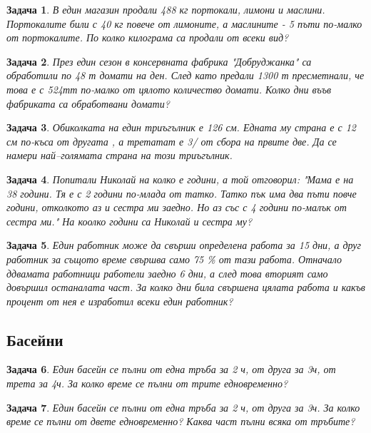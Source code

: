 \documentclass{article}
\newtheorem{problem}{Задача}
\begin{document}
\begin{problem}
	В един магазин продали 488 кг портокали, лимони и маслини. Портокалите били с 40 кг повече от лимоните, а маслините - 5 пъти по-малко от портокалите. По колко килограма са продали от всеки вид?
\end{problem}

\begin{problem}
	През един сезон в консервната фабрика "Добруджанка" са обработили по 48 т домати на ден. След като предали 1300 т пресметнали, че това е с 524тт по-малко от цялото количество домати. Колко дни въъв фабриката са обработвани домати?
\end{problem}


\begin{problem}
	Обиколката на един триъгълник е 126 см. Едната му страна е с 12 см по-къса от другата , а третатат е 3/ от сбора на првите две. Да се намери най--голямата страна на този триъгълник.
\end{problem}


\begin{problem}
	Попитали Николай на колко е години, а той отговорил: "Мама е на 38 години. Тя е с 2 години по-млада от татко. Татко пък има два пъти повче години, отколкото аз и сестра ми заедно. Но аз със с 4 години по-малък от сестра ми." На коолко години са Николай и сестра му?
\end{problem}


\begin{problem}
	Един работник може да свърши определена работа за 15 дни, а друг работник за същото време свършва само 75 \% от тази работа. Отначало ддвамата  работници работели заедно 6 дни, а след това вторият само довършил останалата част. За колко дни била свършена цялата работа и какъв процент от нея е изработил всеки един работник?
\end{problem}

\subsection{Басейни}

\begin{problem}
	Един басейн се пълни от една тръба за 2 ч, от друга за 3ч, от трета за 4ч. За колко време се пълни от трите едновременно? 
\end{problem}


\begin{problem}
	Един басейн се пълни от една тръба за 2 ч, от друга за 3ч. За колко време се пълни от двете едновременно? Каква част пълни всяка от тръбите?
\end{problem}
\end{document}
